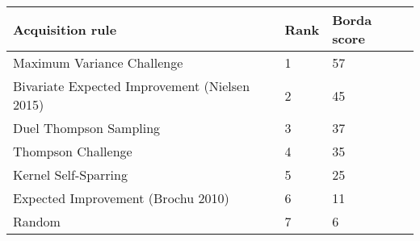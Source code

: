 \begin{tabular}{lll}
Acquisition rule & Rank & Borda score \\ 
\hline 
Maximum Variance Challenge & 1 & 57 \\ 
Bivariate Expected Improvement (Nielsen 2015) & 2 & 45 \\ 
Duel Thompson Sampling & 3 & 37 \\ 
Thompson Challenge & 4 & 35 \\ 
Kernel Self-Sparring & 5 & 25 \\ 
Expected Improvement (Brochu 2010) & 6 & 11 \\ 
Random & 7 & 6 \\ 
\hline 
\end{tabular}